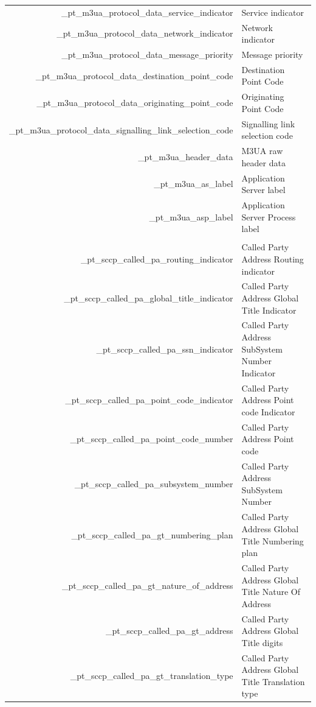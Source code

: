 \documentclass[a4paper,latin]{paper}
\begin{document}
\noindent
\begin{tabularx}{\linewidth}{ | >{\ttfamily} r | >{\ttfamily} X |}
	\hline
	\rowcolor{blue!10}
	\multicolumn{2}{| l |}{\acrfull{m3ua}}			\\
	\hline
	\_pt\_m3ua\_protocol\_data\_service\_indicator			& Service indicator \\
	\_pt\_m3ua\_protocol\_data\_network\_indicator			& Network indicator \\
	\_pt\_m3ua\_protocol\_data\_message\_priority			& Message priority \\
	\_pt\_m3ua\_protocol\_data\_destination\_point\_code		& Destination Point Code \\
	\_pt\_m3ua\_protocol\_data\_originating\_point\_code		& Originating Point Code \\
	\_pt\_m3ua\_protocol\_data\_signalling\_link\_selection\_code	& Signalling link selection code \\
	\_pt\_m3ua\_header\_data					& M3UA raw header data \\
	\_pt\_m3ua\_as\_label						& Application Server label \\
	\_pt\_m3ua\_asp\_label						& Application Server Process label \\
	\hline
	\rowcolor{blue!10}
	\multicolumn{2}{| l |}{\acrfull{sccp}}			\\
	\hline
	\_pt\_sccp\_called\_pa\_routing\_indicator		& Called Party Address Routing indicator \\
	\_pt\_sccp\_called\_pa\_global\_title\_indicator	& Called Party Address Global Title Indicator \\
	\_pt\_sccp\_called\_pa\_ssn\_indicator			& Called Party Address SubSystem Number Indicator \\
	\_pt\_sccp\_called\_pa\_point\_code\_indicator		& Called Party Address Point code Indicator \\
	\_pt\_sccp\_called\_pa\_point\_code\_number		& Called Party Address Point code \\
	\_pt\_sccp\_called\_pa\_subsystem\_number		& Called Party Address SubSystem Number \\
	\_pt\_sccp\_called\_pa\_gt\_numbering\_plan		& Called Party Address Global Title Numbering plan \\
	\_pt\_sccp\_called\_pa\_gt\_nature\_of\_address		& Called Party Address Global Title Nature Of Address \\
	\_pt\_sccp\_called\_pa\_gt\_address			& Called Party Address Global Title digits \\
	\_pt\_sccp\_called\_pa\_gt\_translation\_type		& Called Party Address Global Title Translation type \\

\end{tabularx}
\end{document}
